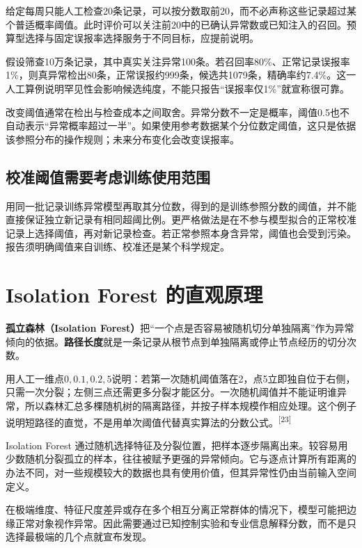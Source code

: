 给定每周只能人工检查20条记录，可以按分数取前20，而不必声称这些记录超过某个普适概率阈值。此时评价可以关注前20中的已确认异常数或已知注入的召回。预算型选择与固定误报率选择服务于不同目标，应提前说明。

假设筛查10万条记录，其中真实关注异常100条。若召回率80\%、正常记录误报率1\%，则真异常检出80条，正常误报约999条，候选共1079条，精确率约7.4\%。这一人工算例说明罕见性会影响候选纯度，不能只报告“误报率仅1\%”就宣称很可靠。

改变阈值通常在检出与检查成本之间取舍。异常分数不一定是概率，阈值0.5也不自动表示“异常概率超过一半”。如果使用参考数据某个分位数定阈值，这只是依据该参照分布的操作规则；未来分布变化会改变误报率。

\subsection{校准阈值需要考虑训练使用范围}
用同一批记录训练异常模型再取其分位数，得到的是训练参照分数的阈值，并不能直接保证独立新记录有相同超阈比例。更严格做法是在不参与模型拟合的正常校准记录上选择阈值，再对新记录检查。若正常参照本身含异常，阈值也会受到污染。报告须明确阈值来自训练、校准还是某个科学规定。

\section{Isolation Forest 的直观原理}

\textbf{孤立森林（Isolation Forest）}把“一个点是否容易被随机切分单独隔离”作为异常倾向的依据。\textbf{路径长度}就是一条记录从根节点到单独隔离或停止节点经历的切分次数。

用人工一维点$0,0.1,0.2,5$说明：若第一次随机阈值落在2，点5立即独自位于右侧，只需一次分裂；左侧三点还需更多分裂才能区分。一次随机阈值并不能证明谁异常，所以森林汇总多棵随机树的隔离路径，并按子样本规模作相应处理。这个例子说明短路径的直觉，不是用单次阈值代替真实算法的分数公式。\textsuperscript{[23]}

Isolation Forest 通过随机选择特征及分裂位置，把样本逐步隔离出来。较容易用少数随机分裂孤立的样本，往往被赋予更强的异常倾向。它与逐点计算所有距离的办法不同，对一些规模较大的数据也具有使用价值，但其异常性仍由当前输入空间定义。


在极端维度、特征尺度差异或存在多个相互分离正常群体的情况下，模型可能把边缘正常对象视作异常。因此需要通过已知控制实验和专业信息解释分数，而不是只选择最极端的几个点就宣布发现。

